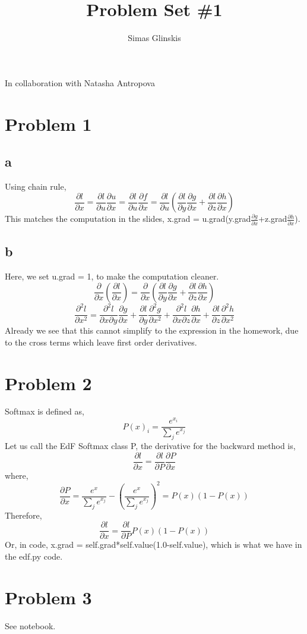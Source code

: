 \documentclass[]{article}
\title{Problem Set \#1}
\author{Simas Glinskis}
\begin{document}
\maketitle
In collaboration with Natasha Antropova 


\section*{Problem 1}
\subsection*{a}
Using chain rule,
\[
\frac{\partial l}{\partial x} = \frac{\partial l}{\partial u}\frac{\partial u}{\partial x} = \frac{\partial l}{\partial u}\frac{\partial f}{\partial x} = \frac{\partial l}{\partial u}(\frac{\partial l}{\partial y}\frac{\partial g}{\partial x}+\frac{\partial l}{\partial z}\frac{\partial h}{\partial x})
\]
This matches the computation in the slides, x.grad = u.grad(y.grad$\frac{\partial g}{\partial x}$+z.grad$\frac{\partial h}{\partial x}$).
\subsection*{b}
Here, we set u.grad = 1, to make the computation cleaner. 
\[
\frac{\partial}{\partial x}(\frac{\partial l}{\partial x}) = \frac{\partial }{\partial x}(\frac{\partial l}{\partial y}\frac{\partial g}{\partial x}+\frac{\partial l}{\partial z}\frac{\partial h}{\partial x})
\]
\[
\frac{\partial^2 l}{\partial x^2} = \frac{\partial^2l}{\partial x \partial y}\frac{\partial g}{\partial x} + \frac{\partial l}{\partial y}\frac{\partial^2 g}{\partial x^2} +\frac{\partial^2 l}{\partial x \partial z}\frac{\partial h}{\partial x} + \frac{\partial l}{\partial z}\frac{\partial^2 h}{\partial x^2}
\]
Already we see that this cannot simplify to the expression in the homework, due to the cross terms which leave first order derivatives.

\section*{Problem 2}
Softmax is defined as, 
\[
P(x)_i = \frac{e^{x_i}}{\sum_{j}e^{x_j}}
\]
Let us call the EdF Softmax class P, the derivative for the backward method is,
\[
\frac{\partial l}{\partial x} = \frac{\partial l}{\partial P}\frac{\partial P}{\partial x}
\]
where,
\[
\frac{\partial P}{\partial x} = \frac{e^x}{\sum_j e^{x_j}}-(\frac{e^{x}}{\sum_j e^{x_j}})^2 = P(x)(1-P(x))
\]
Therefore,
\[
\frac{\partial l}{\partial x} = \frac{\partial l}{\partial P}P(x)(1-P(x))
\]
Or, in code, x.grad = self.grad*self.value(1.0-self.value), which is what we have in the edf.py code.
\section*{Problem 3}
See notebook.
\end{document}
